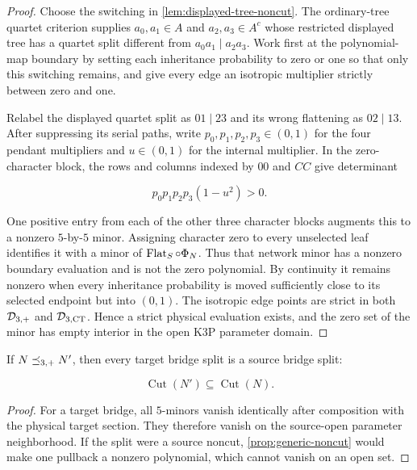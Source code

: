 \begin{proof}
Choose the switching in \cref{lem:displayed-tree-noncut}.  The ordinary-tree
quartet criterion supplies \(a_0,a_1\in A\) and
\(a_2,a_3\in A^c\) whose restricted displayed tree has a quartet split
different from \(a_0a_1\mid a_2a_3\).  Work first at the polynomial-map
boundary by setting each inheritance probability to zero or one so that only
this switching remains, and give every edge an isotropic multiplier strictly
between zero and one.

Relabel the displayed quartet split as \(01\mid23\) and its wrong flattening
as \(02\mid13\).  After suppressing its serial paths, write
\(p_0,p_1,p_2,p_3\in(0,1)\) for the four pendant multipliers and
\(u\in(0,1)\) for the internal multiplier.  In the zero-character block, the
rows and columns indexed by \(00\) and \(CC\) give determinant

\[
 p_0p_1p_2p_3(1-u^2)>0.
\]

One positive entry from each of the other three character blocks augments
this to a nonzero \(5\)-by-\(5\) minor.  Assigning character zero to every
unselected leaf identifies it with a minor of \(\operatorname{Flat}_S\circ\Phi_N\).
Thus that network minor has a nonzero boundary evaluation and is not the zero
polynomial.  By continuity it remains nonzero when every inheritance
probability is moved sufficiently close to its selected endpoint but into
\((0,1)\).  The isotropic edge points are strict in both \(\mathcal D_{3,+}\) and
\(\mathcal D_{3,\mathrm{CT}}\).  Hence a strict physical evaluation exists, and the zero set of the
minor has empty interior in the open K3P parameter domain.
\end{proof}

\begin{corollary}\label{cor:target-source-cut}
If \(N\preceq_{3,+} N'\), then every target bridge split is a source bridge
split:

\[
 \operatorname{Cut}(N')\subseteq\operatorname{Cut}(N).
\]
\end{corollary}

\begin{proof}
For a target bridge, all \(5\)-minors vanish identically after composition
with the physical target section.  They therefore vanish on the source-open
parameter neighborhood.  If the split were a source noncut,
\cref{prop:generic-noncut} would make one pullback a nonzero polynomial,
which cannot vanish on an open set.
\end{proof}


